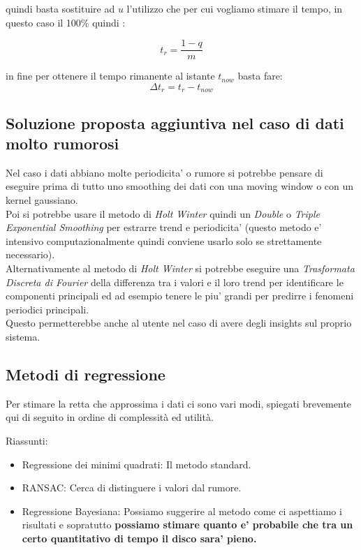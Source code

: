 \documentclass{article}
\begin{document}
quindi basta sostituire ad \(u\) l'utilizzo che per cui vogliamo stimare il tempo, in questo caso il 100\% quindi :

\[t_r = \frac{1 - q}{m}\]

in fine per ottenere il tempo rimanente al istante \(t_{now}\)  basta fare:
\[\Delta t_r = t_r - t_{now}\]

\subsection{Soluzione proposta aggiuntiva nel caso di dati molto rumorosi}
Nel caso i dati abbiano molte periodicita' o rumore si potrebbe pensare di eseguire prima di tutto uno smoothing dei dati con una moving window o con un kernel gaussiano.
\\
Poi si potrebbe usare il metodo di \textit{Holt Winter} quindi un \textit{Double} o \textit{Triple Exponential Smoothing} per estrarre trend e periodicita' (questo metodo e' intensivo computazionalmente quindi conviene usarlo solo se strettamente necessario).
\\
Alternativamente al metodo di \textit{Holt Winter}  si potrebbe eseguire una \textit{Trasformata Discreta di Fourier} della differenza tra i valori e il loro trend per identificare le componenti principali ed ad esempio tenere le piu' grandi per predirre i fenomeni  periodici principali.
\\
Questo permetterebbe anche al utente nel caso di avere degli insights sul proprio sistema.

\subsection{Metodi di regressione}
Per stimare la retta che approssima i dati ci sono vari modi, spiegati brevemente qui di seguito in ordine di complessità ed utilità.

Riassunti:
\begin{itemize}
    \item Regressione dei minimi quadrati: Il metodo standard.
    \item RANSAC: Cerca di distinguere i valori dal rumore.
    \item Regressione Bayesiana: Possiamo suggerire al metodo come ci aspettiamo i risultati e sopratutto \textbf{possiamo stimare quanto e' probabile che tra un certo quantitativo di tempo il disco sara' pieno.}
\end{itemize}

\clearpage
\end{document}
